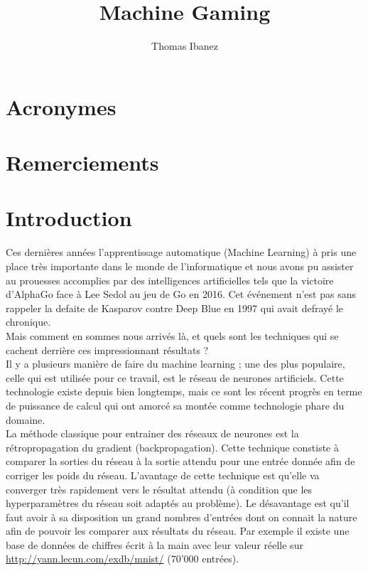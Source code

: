 \documentclass{article}
\title{Machine Gaming}
\author{Thomas Ibanez}
\begin{document}
\tableofcontents

\newpage

\listoffigures

\newpage

\section*{Acronymes}
\section*{Remerciements}

\newpage
\section{Introduction}

Ces dernières années l'apprentissage automatique (Machine Learning) à pris une place très importante dans le monde de l'informatique et nous avons pu assister au prouesses accomplies par des intelligences artificielles tels que la victoire d'AlphaGo face à Lee Sedol au jeu de Go en 2016.\cite{wikialphagolee} Cet événement n'est pas sans rappeler la defaite de Kasparov contre Deep Blue en 1997 qui avait defrayé le chronique.\cite{kasparov}\\
Mais comment en sommes nous arrivés là, et quels sont les techniques qui se cachent derrière ces impressionnant résultats ?\\
Il y a plusieurs manière de faire du machine learning ; une des plus populaire, celle qui est utilisée pour ce travail, est le réseau de neurones artificiels. Cette technologie existe depuis bien longtemps, mais ce sont les récent progrès en terme de puissance de calcul qui ont amorcé sa montée comme technologie phare du domaine.\cite{nnpower}\\

La méthode classique pour entrainer des réseaux de neurones est la rétropropagation du gradient (backpropagation). Cette technique constiste à comparer la sorties du réseau à la sortie attendu pour une entrée donnée afin de corriger les poids du réseau.\cite{backprop} L'avantage de cette technique est qu'elle va converger très rapidement vers le résultat attendu (à condition que les hyperparamètres du réseau soit adaptés au problème). Le désavantage est qu'il faut avoir à sa disposition un grand nombres d'entrées dont on connait la nature afin de pouvoir les comparer aux résultats du réseau. Par exemple il existe une base de données de chiffres écrit à la main avec leur valeur réelle sur \url{http://yann.lecun.com/exdb/mnist/} (70'000 entrées).\\
\end{document}
